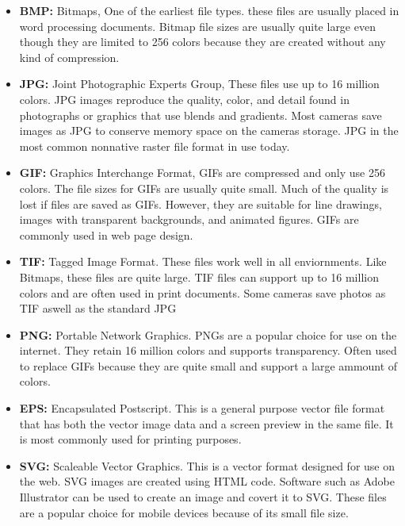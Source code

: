 \documentclass{report}
\begin{document}
    \bigbreak \noindent 
    \begin{itemize}
        \item \textbf{BMP:} Bitmaps, One of the earliest file types. these files 
            are usually placed in word processing documents. Bitmap file sizes are usually 
            quite large even though they are limited to 256 colors because they are created without
            any kind of compression.
        \item \textbf{JPG:} Joint Photographic Experts Group, These files use up to 16 million
            colors. JPG images reproduce the quality, color, and detail found in photographs or graphics
            that use blends and gradients. Most cameras save images as JPG to conserve memory space
            on the cameras storage. JPG in the most common nonnative raster file format in use today.
        \item \textbf{GIF:} Graphics Interchange Format, GIFs are compressed and only use 256 colors. 
            The file sizes for GIFs are usually quite small. Much of the quality is lost if 
            files are saved as GIFs. However, they are suitable for line drawings, images with
            transparent backgrounds, and animated figures. GIFs are commonly used in web page design.
        \item \textbf{TIF:} Tagged Image Format. These files work well in all enviornments. Like Bitmaps, 
            these files are quite large. TIF files can support up to 16 million colors and are 
            often used in print documents. Some cameras save photos as TIF aswell as the standard JPG
        \item \textbf{PNG:} Portable Network Graphics. PNGs are a popular choice for use on the internet.
            They retain 16 million colors and supports transparency. Often used to replace GIFs because 
            they are quite small and support a large ammount of colors.
        \item \textbf{EPS:} Encapsulated Postscript. This is a general purpose vector file format
            that has both the vector image data and a screen preview in the same file. 
            It is most commonly used for printing purposes.
        \item \textbf{SVG:} Scaleable Vector Graphics. This is a vector format designed for use 
            on the web. SVG images are created using HTML code. Software such as Adobe Illustrator
            can be used to create an image and covert it to SVG. These files are a popular choice for 
            mobile devices because of its small file size.
    \end{itemize}
\end{document}
